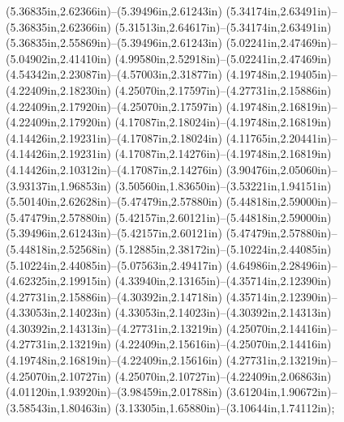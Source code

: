 (5.36835in,2.62366in)--(5.39496in,2.61243in) (5.34174in,2.63491in)--(5.36835in,2.62366in) (5.31513in,2.64617in)--(5.34174in,2.63491in) (5.36835in,2.55869in)--(5.39496in,2.61243in) (5.02241in,2.47469in)--(5.04902in,2.41410in) (4.99580in,2.52918in)--(5.02241in,2.47469in) (4.54342in,2.23087in)--(4.57003in,2.31877in) (4.19748in,2.19405in)--(4.22409in,2.18230in) (4.25070in,2.17597in)--(4.27731in,2.15886in) (4.22409in,2.17920in)--(4.25070in,2.17597in) (4.19748in,2.16819in)--(4.22409in,2.17920in) (4.17087in,2.18024in)--(4.19748in,2.16819in) (4.14426in,2.19231in)--(4.17087in,2.18024in) (4.11765in,2.20441in)--(4.14426in,2.19231in) (4.17087in,2.14276in)--(4.19748in,2.16819in) (4.14426in,2.10312in)--(4.17087in,2.14276in) (3.90476in,2.05060in)--(3.93137in,1.96853in) (3.50560in,1.83650in)--(3.53221in,1.94151in) (5.50140in,2.62628in)--(5.47479in,2.57880in) (5.44818in,2.59000in)--(5.47479in,2.57880in) (5.42157in,2.60121in)--(5.44818in,2.59000in) (5.39496in,2.61243in)--(5.42157in,2.60121in) (5.47479in,2.57880in)--(5.44818in,2.52568in) (5.12885in,2.38172in)--(5.10224in,2.44085in) (5.10224in,2.44085in)--(5.07563in,2.49417in) (4.64986in,2.28496in)--(4.62325in,2.19915in) (4.33940in,2.13165in)--(4.35714in,2.12390in) (4.27731in,2.15886in)--(4.30392in,2.14718in) (4.35714in,2.12390in)--(4.33053in,2.14023in) (4.33053in,2.14023in)--(4.30392in,2.14313in) (4.30392in,2.14313in)--(4.27731in,2.13219in) (4.25070in,2.14416in)--(4.27731in,2.13219in) (4.22409in,2.15616in)--(4.25070in,2.14416in) (4.19748in,2.16819in)--(4.22409in,2.15616in) (4.27731in,2.13219in)--(4.25070in,2.10727in) (4.25070in,2.10727in)--(4.22409in,2.06863in) (4.01120in,1.93920in)--(3.98459in,2.01788in) (3.61204in,1.90672in)--(3.58543in,1.80463in) (3.13305in,1.65880in)--(3.10644in,1.74112in);
